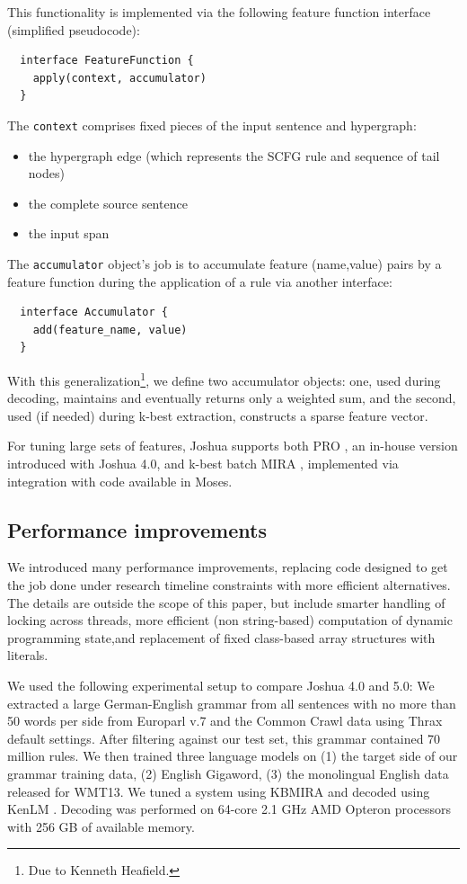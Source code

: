 \documentclass[11pt]{article}
\begin{document}
This functionality is implemented via the following
feature function interface (simplified pseudocode):
%
\begin{verbatim}
  interface FeatureFunction {
    apply(context, accumulator)
  }
\end{verbatim}
%
The \verb|context| comprises fixed pieces of the input sentence and
hypergraph:
%
\begin{itemize}
\item the hypergraph edge (which represents the SCFG rule and sequence
  of tail nodes)
\item the complete source sentence
\item the input span
\end{itemize}
%
The \verb|accumulator| object's job is to accumulate feature
(name,value) pairs by a feature function during the application of a
rule via another interface:
%
\begin{verbatim}
  interface Accumulator {
    add(feature_name, value)
  }
\end{verbatim}
%
With this generalization\footnote{Due to Kenneth Heafield.}, we
define two accumulator objects: one, used during decoding, maintains
and eventually returns only a weighted sum, and the second, used (if
needed) during k-best extraction, constructs a sparse feature vector.

For tuning large sets of features, Joshua supports both PRO
\cite{PRO2011}, an in-house version introduced with Joshua 4.0, and
k-best batch MIRA \cite{cherry2012batch}, implemented via integration
with code available in Moses.

\subsection{Performance improvements}
\label{sec:performance}

We introduced many performance improvements, replacing code designed
to get the job done under research timeline constraints with more
efficient alternatives. The details are outside the scope of this
paper, but include smarter handling of locking across threads, more
efficient (non string-based) computation of dynamic programming state,and
replacement of fixed class-based array structures with literals.

We used the following experimental setup to compare Joshua 4.0 and
5.0: We extracted a large German-English grammar from all sentences
with no more than 50 words per side from Europarl v.7 and the Common
Crawl data using Thrax default settings.  After filtering against our
test set, this grammar contained 70 million rules.  We then trained
three language models on (1) the target side of our grammar training
data, (2) English Gigaword, (3) the monolingual English data released
for WMT13. We tuned a system using KBMIRA and decoded using KenLM
\cite{KenLM}.  Decoding was performed on 64-core 2.1 GHz AMD Opteron
processors with 256 GB of available memory.
\end{document}
